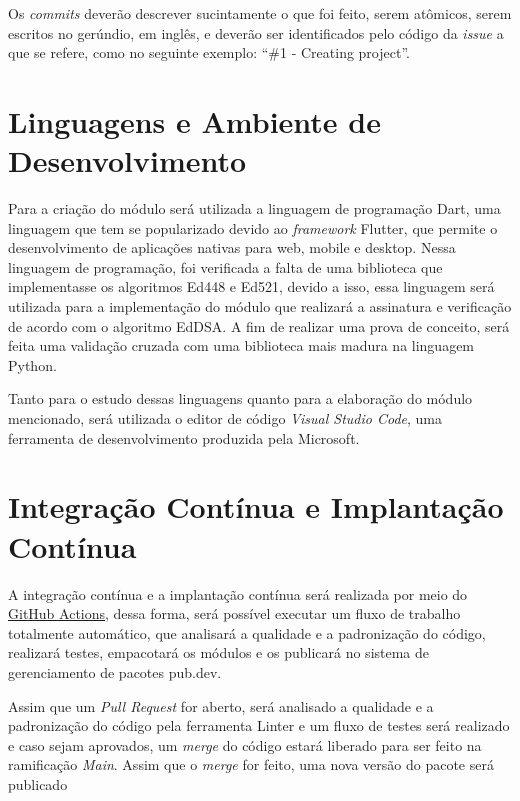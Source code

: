Os \textit{commits} deverão descrever sucintamente o que foi feito, serem atômicos, serem escritos no gerúndio, em inglês, e deverão ser identificados pelo código da \textit{issue} a que se refere, como no seguinte exemplo: ``\#1 - Creating project''.

\section{Linguagens e Ambiente de Desenvolvimento}

Para a criação do módulo será utilizada a linguagem de programação Dart, uma linguagem que tem se popularizado devido ao \textit{framework} Flutter, que permite o desenvolvimento de aplicações nativas para web, mobile e desktop. Nessa linguagem de programação, foi verificada a falta de uma biblioteca que implementasse os algoritmos Ed448 e Ed521, devido a isso, essa linguagem será utilizada para a implementação do módulo que realizará a assinatura e verificação de acordo com o algoritmo EdDSA. A fim de realizar uma prova de conceito, será feita uma validação cruzada com uma biblioteca mais madura na linguagem Python. 

Tanto para o estudo dessas linguagens quanto para a elaboração do módulo mencionado, será utilizada o editor de código \textit{Visual Studio Code}, uma ferramenta de desenvolvimento produzida pela Microsoft.

\section{Integração Contínua e Implantação Contínua}

A integração contínua e a implantação contínua será realizada por meio do \href{https://docs.github.com/pt/actions}{GitHub Actions}, dessa forma, será possível executar um fluxo de trabalho totalmente automático, que analisará a qualidade e a padronização do código, realizará testes, empacotará os módulos e os publicará no sistema de gerenciamento de pacotes pub.dev.

Assim que um \textit{Pull Request} for aberto, será analisado a qualidade e a padronização do código pela ferramenta Linter e um fluxo de testes será realizado e caso sejam aprovados, um \textit{merge} do código estará liberado para ser feito na ramificação \textit{Main}. Assim que o \textit{merge} for feito, uma nova versão do pacote será publicado  

